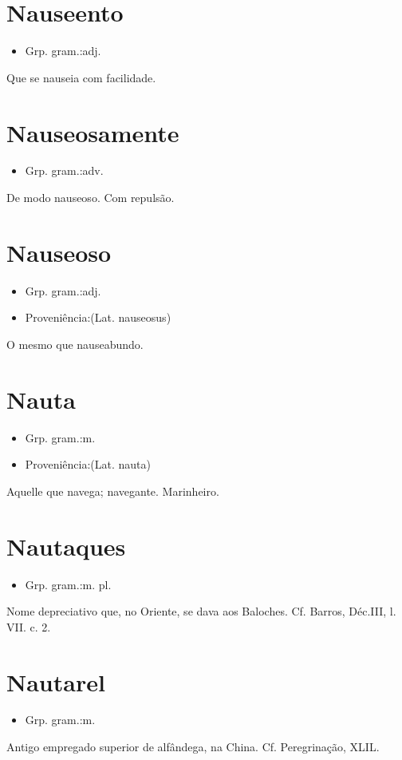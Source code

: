 \section{Nauseento}
\begin{itemize}
\item {Grp. gram.:adj.}
\end{itemize}
Que se nauseia com facilidade.
\section{Nauseosamente}
\begin{itemize}
\item {Grp. gram.:adv.}
\end{itemize}
De modo nauseoso.
Com repulsão.
\section{Nauseoso}
\begin{itemize}
\item {Grp. gram.:adj.}
\end{itemize}
\begin{itemize}
\item {Proveniência:(Lat. \textunderscore nauseosus\textunderscore )}
\end{itemize}
O mesmo que \textunderscore nauseabundo\textunderscore .
\section{Nauta}
\begin{itemize}
\item {Grp. gram.:m.}
\end{itemize}
\begin{itemize}
\item {Proveniência:(Lat. \textunderscore nauta\textunderscore )}
\end{itemize}
Aquelle que navega; navegante.
Marinheiro.
\section{Nautaques}
\begin{itemize}
\item {Grp. gram.:m. pl.}
\end{itemize}
Nome depreciativo que, no Oriente, se dava aos Baloches. Cf. Barros, \textunderscore Déc.\textunderscore  III, l. VII. c. 2.
\section{Nautarel}
\begin{itemize}
\item {Grp. gram.:m.}
\end{itemize}
Antigo empregado superior de alfândega, na China. Cf. \textunderscore Peregrinação\textunderscore , XLIL.

